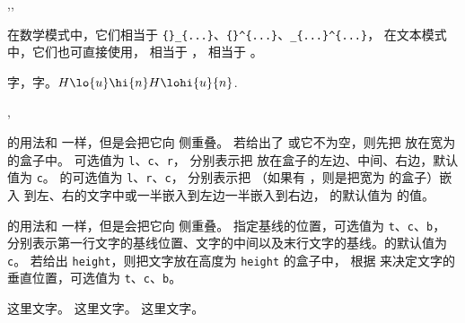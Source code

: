 \documentclass{whudoc}
\begin{document}
\begin{function}{\lo,\hi,\lohi} 
  \begin{syntax}
    \V\lo   {}
    \V\hi   {}
    \V\lohi {} 
  \end{syntax}
在数学模式中，它们相当于 \verb|{}_{...}|、\verb|{}^{...}|、\verb|_{...}^{...}|，
在文本模式中，它们也可直接使用， 相当于 ，
 相当于 。
\end{function}

\begin{xample}
\Large 字，字。$ H\lo{u}\hi{n} H\lohi{u}{n}$.
\stopxamplecode
\xampleprint
\end{xample}

\begin{function}{\makelapbox,\parlapbox}
  \begin{syntax}
    \V\makelapbox {}
    \V\makelapbox {}  
    \V\makelapbox {}   
    \V\parlapbox  {} 
    \V\parlapbox  {}    
    \V\parlapbox  {}     
  \end{syntax}

 的用法和  一样，但是会把它向  侧重叠。
若给出了  或它不为空，则先把  放在宽为  的盒子中。
 可选值为 \texttt{l}、\texttt{c}、\texttt{r}，
分别表示把  放在盒子的左边、中间、右边，默认值为 \texttt{c}。
 的可选值为 \texttt{l}、\texttt{r}、\texttt{c}，
分别表示把 （如果有 ，则是把宽为  的盒子）嵌入
到左、右的文字中或一半嵌入到左边一半嵌入到右边， 的默认值为  的值。

 的用法和  一样，但是会把它向  侧重叠。
 指定基线的位置，可选值为 \texttt{t}、\texttt{c}、\texttt{b}，
分别表示第一行文字的基线位置、文字的中间以及末行文字的基线。的默认值为 \texttt{c}。
若给出 \texttt{height}，则把文字放在高度为 \texttt{height} 的盒子中，
根据  来决定文字的垂直位置，可选值为 \texttt{t}、\texttt{c}、\texttt{b}。
\end{function}

\begin{xample}
这里文字。
这里文字。
这里文字。
\stopxamplecode
\xampleprint
\end{xample}
\end{document}
